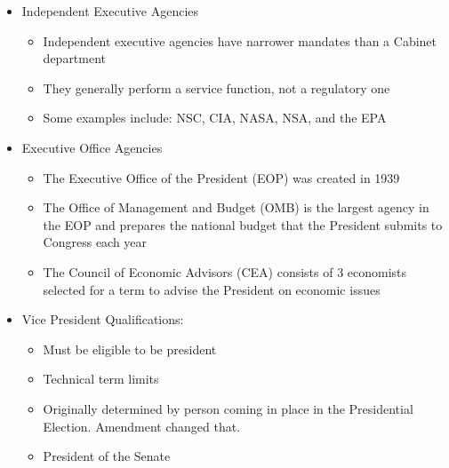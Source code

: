 \documentclass[12pt]{article}
\begin{document}
\begin{itemize}
\begin{itemize}
    \end{itemize}

  \item Independent Executive Agencies

    \begin{itemize}

      \item Independent executive agencies have narrower mandates than a Cabinet department

      \item They generally perform a service function, not a regulatory one

      \item Some examples include: NSC, CIA, NASA, NSA, and the EPA

    \end{itemize}

  \item Executive Office Agencies

    \begin{itemize}

      \item The Executive Office of the President (EOP) was created in 1939

      \item The Office of Management and Budget (OMB) is the largest agency in the EOP and prepares the national budget that the President submits to Congress each year

      \item The Council of Economic Advisors (CEA) consists of 3 economists selected for a term to advise the President on economic issues

    \end{itemize}

  \item Vice President Qualifications:

    \begin{itemize}

      \item Must be eligible to be president

      \item Technical term limits

      \item Originally determined by person coming in  place in the Presidential Election.  Amendment changed that.

      \item President of the Senate


\end{itemize}
\end{itemize}
\end{document}

